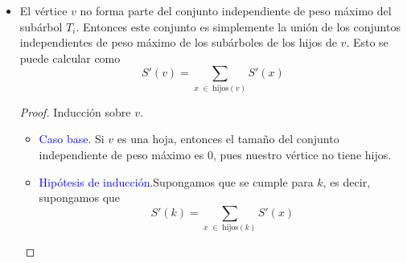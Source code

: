 \documentclass[letterpaper,11pt]{article}
\begin{document}
\begin{enumerate}
\begin{itemize}
\begin{proof}
\begin{itemize}
                tiene el tamaño del conjunto independiente de peso máximo. 

                \item \textcolor{blue}{Paso inductivo}. Queremos probar que se 
                cumple para $k+1$. Entonces 
                \begin{align*}
                    S(k+1)
                    &= S(k) + w(u) \\
                    &= \left(w(k) + \sum_{x \; \in \; \text{nietos}(k)} S(x)
                       \right) + w(u)
                \end{align*}

                Como $u$ fue agregado al conjunto $S$, eso significa que $u$ 
                es una hoja o es el nieto de un vértice $v$. Por hipótesis de 
                inducción, sabemos que $S(k)$ tiene el tamaño del conjunto 
                independiente de peso máximo. Así, al sumarle $w(u)$ a este 
                valor, obtenemos que $S(k+1)$ tiene el tamaño del conjunto 
                independiente de peso máximo.
            \end{itemize}
        \end{proof}

        \item El vértice $v$ no forma parte del conjunto independiente de peso 
        máximo del subárbol $T_i$. Entonces este conjunto es simplemente la 
        unión de los conjuntos independientes de peso máximo de los subárboles 
        de los hijos de $v$. Esto se puede calcular como 
        \begin{equation*}
            S'(v) = \sum_{x \; \in \; \text{hijos}(v)} S'(x)
        \end{equation*} 

        \begin{proof}
            Inducción sobre $v$.
            \begin{itemize}
                \item \textcolor{blue}{Caso base}. Si $v$ es una hoja, entonces 
                el tamaño del conjunto independiente de peso máximo es $0$, 
                pues nuestro vértice no tiene hijos.

                \item \textcolor{blue}{Hipótesis de inducción}.Supongamos que se
                cumple para $k$, es decir, supongamos que 
                \begin{equation*}
                    S'(k) = \sum_{x \; \in \; \text{hijos}(k)} S'(x)
                \end{equation*}


\end{itemize}
\end{proof}
\end{itemize}
\end{enumerate}
\end{document}
